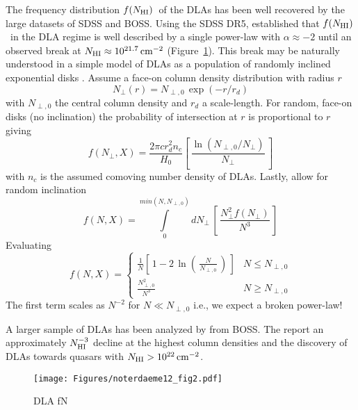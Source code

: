 \documentclass[graybox]{svmult}
\def\ltk{\left [ \,}
\def\ltp{\left ( \,}
\def\rtk{\, \right  ] }
\def\rtp{\, \right  ) }
\def\intl{\int\limits}
\newcommand{\mnhi}{N_{\rm HI}}
\def\cm#1{\, {\rm cm^{#1}}}
\def\mfnhi{f(\mnhi)}
\def\fnhi{$\mfnhi$}
\begin{document}
The frequency distribution \fnhi\ of the DLAs has been well
recovered by the large datasets of SDSS and BOSS.  Using
the SDSS DR5, \cite{phw05} established that \fnhi\ in the DLA
regime is well described by a single power-law with $\alpha \approx -2$
until an observed break at $\mnhi \approx 10^{21.7} \cm{-2}$
(Figure~\ref{fig:phw05_fN}).
This break may be naturally understood in a simple model
of DLAs as a population of randomly inclined exponential disks
\cite{fp93,wolfe95}.
Assume a face-on column density distribution with radius $r$
\begin{equation}
N_\perp (r) = N_{\perp,0} \, \exp(-r/r_d)
\end{equation}
with $N_{\perp,0}$ the central column density and $r_d$ a scale-length.
For random, face-on disks (no inclination) the probability
of intersection at $r$ is proportional to $r$ giving
\begin{equation}
f(N_\perp,X) = \frac{2 \pi c r_d^2 n_c}{H_0} \ltk \frac{\ln (N_{\perp,0}/N_\perp)}{N_\perp} \rtk
\end{equation}
with  $n_c$ is the assumed comoving number density of DLAs.
Lastly, allow for random inclination
\begin{equation}
f(N,X) = \intl_0^{min(N,N_{\perp,0})} dN_\perp \, \ltk \frac{N_\perp^2 f(N_\perp)}{N^3} \rtk
\end{equation}
Evaluating 
\begin{equation}
f(N,X) = 
        \begin{cases}
        \frac{1}{N} \ltk 1 - 2 \, \ln \ltp \frac{N}{N_{\perp,0}} \rtp \rtk & N \le N_{\perp, 0} \\
        \frac{N_{\perp,0}^2}{N^3} & N \ge N_{\perp,0}
        \end{cases}
      \end{equation}
The first term scales as $N^{-2}$ for $N \ll N_{\perp,0}$
i.e., we expect a broken power-law!

A larger sample of DLAs has been analyzed by \cite{noterdaeme12}
from BOSS.
The report an approximately $\mnhi^{-3}$ decline at the highest column 
densities and the
discovery of DLAs towards quasars 
with $\mnhi > 10^{22} \cm{-2}$.


%
\begin{figure}[b]
\sidecaption
\texttt{[image: Figures/noterdaeme12\_fig2.pdf]}
%
%
\caption{DLA fN
}
\label{fig:phw05_fN}       %
\end{figure}
\end{document}
